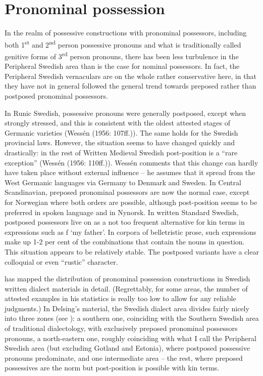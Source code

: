 \section{Pronominal possession}

In the realm of possessive constructions with pronominal possessors, including both 1\textsuperscript{st} and 2\textsuperscript{nd} person possessive pronouns and what is traditionally called genitive forms of 3\textsuperscript{rd} person pronouns, there has been less turbulence in the Peripheral Swedish area than is the case for nominal possessors. In fact, the Peripheral Swedish vernaculars are on the whole rather conservative here, in that they have not in general followed the general trend towards preposed rather than postposed pronominal possessors. 

In Runic Swedish, possessive pronouns were generally postposed, except when strongly stressed, and this is consistent with the oldest attested stages of Germanic varieties (Wessén (1956: 107ff.)). The same holds for the Swedish provincial laws. However, the situation seems to have changed quickly and drastically: in the rest of Written Medieval Swedish post-position is a “rare exception” (Wessén (1956: 110ff.)). Wessén comments that this change can hardly have taken place without external influence – he assumes that it spread from the West Germanic languages via Germany to Denmark and Sweden. In Central Scandinavian, preposed pronominal possessors are now the normal case, except for Norwegian where both orders are possible, although post-position seems to be preferred in spoken language and in Nynorsk. In written Standard Swedish, postposed possessors live on as a not too frequent alternative for kin terms in expressions such as f ‘my father’. In corpora of belletristic prose, such expressions make up 1-2 per cent of the combinations that contain the nouns in question. This situation appears to be relatively stable. The postposed variants have a clear colloquial or even “rustic” character. 

\citet[32]{Delsing2003a} has mapped the distribution of pronominal possession constructions in Swedish written dialect materials in detail. (Regrettably, for some areas, the number of attested examples in his statistics is really too low to allow for any reliable judgments.) In Delsing’s material, the Swedish dialect area divides fairly nicely into three zones (see ): a southern one, coinciding with the Southern Swedish area of traditional dialectology, with exclusively preposed pronominal possessors pronouns, a north-eastern one, roughly coinciding with what I call the Peripheral Swedish area (but excluding Gotland and Estonia), where postposed possessive pronouns predominate, and one intermediate area – the rest, where preposed possessives are the norm but post-position is possible with kin terms.

